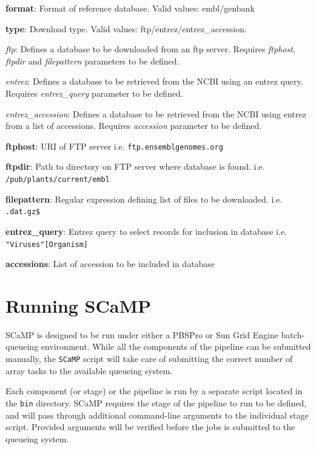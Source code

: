 \documentclass[a4paper,10pt]{article}
\newenvironment{tight_itemize}{
\begin{itemize}
  \setlength{\itemsep}{0pt}
  \setlength{\parskip}{0pt}
}{\end{itemize}}
\begin{document}
\begin{tight_itemize}
\item \textbf{format}: Format of reference database. Valid values: embl/genbank
\item \textbf{type}: Download type. Valid values: ftp/entrez/entrez\_accession.
\begin{tight_itemize}
\item \textit{ftp}: Defines a database to be downloaded from an ftp server.
Requires \textit{ftphost}, \textit{ftpdir} and \textit{filepattern} parameters
to be defined.
\item \textit{entrez}: Defines a database to be retrieved from the NCBI using
an entrez query. Requires \textit{entrez\_query} parameter to be defined.
\item \textit{entrez\_accession}: Defines a database to be retrieved from the
NCBI using entrez from a list of accessions. Requires \textit{accession}
parameter to be defined.
\end{tight_itemize}
\item \textbf{ftphost}: URI of FTP server i.e. {\tt ftp.ensemblgenomes.org}
\item \textbf{ftpdir}: Path to directory on FTP server where database is found.
i.e.  {\tt /pub/plants/current/embl}
\item \textbf{filepattern}: Regular expression defining list of files to be
downloaded. i.e. {\tt .dat.gz\$}
\item \textbf{entrez\_query}:  Entrez query to select records for inclusion in
database i.e. {\tt "Viruses"[Organism]}
\item \textbf{accessions}: List of accession to be included in database
\end{tight_itemize}

\section{Running SCaMP}

SCaMP is designed to be run under either a PBSPro or Sun Grid Engine
batch-queueing environment. While all the components of the pipeline can be
submitted manually, the {\tt SCaMP} script will take care of submitting the
correct number of array tasks to the available queueing system. 

Each component (or stage) or the pipeline is run by a separate script located
in the {\tt bin} directory.  SCaMP requires the stage of the pipeline to run to
be defined, and will pass through additional command-line arguments to the
individual stage script. Provided arguments will be verified before the jobs is
submitted to the queueing system.
\end{document}
